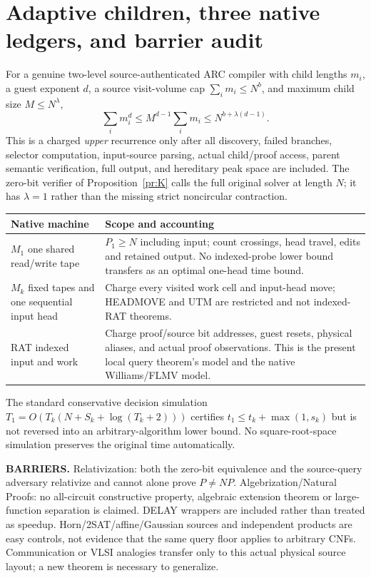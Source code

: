 \documentclass[11pt]{article}
\begin{document}
\section{Adaptive children, three native ledgers, and barrier audit}
For a genuine two-level source-authenticated ARC compiler with child lengths $m_i$, a guest exponent $d$, a source visit-volume cap $\sum_i m_i\le N^b$, and maximum child size $M\le N^\lambda$,
\[
 \sum_i m_i^d\le M^{d-1}\sum_i m_i\le N^{b+\lambda(d-1)}.\tag{5}
\]
This is a charged \emph{upper} recurrence only after all discovery, failed branches, selector computation, input-source parsing, actual child/proof access, parent semantic verification, full output, and hereditary peak space are included. The zero-bit verifier of Proposition~\ref{pr:K} calls the full original solver at length $N$; it has $\lambda=1$ rather than the missing strict noncircular contraction.

\begin{center}\small\begin{tabularx}{.95\linewidth}{p{.21\linewidth}X}\toprule
Native machine & Scope and accounting\\\midrule
$M_1$ one shared read/write tape & $P_1\ge N$ including input; count crossings, head travel, edits and retained output. No indexed-probe lower bound transfers as an optimal one-head time bound.\\
$M_k$ fixed tapes and one sequential input head & Charge every visited work cell and input-head move; HEADMOVE and UTM are restricted and not indexed-RAT theorems.\\
RAT indexed input and work & Charge proof/source bit addresses, guest resets, physical aliases, and actual proof observations. This is the present local query theorem's model and the native Williams/FLMV model.\\\bottomrule
\end{tabularx}\end{center}
The standard conservative decision simulation $T_1=O(T_k(N+S_k+\log(T_k+2)))$ certifies $t_1\le t_k+\max(1,s_k)$ but is not reversed into an arbitrary-algorithm lower bound. No square-root-space simulation preserves the original time automatically.

\noindent\textbf{BARRIERS.} Relativization: both the zero-bit equivalence and the source-query adversary relativize and cannot alone prove $P\ne NP$. Algebrization/Natural Proofs: no all-circuit constructive property, algebraic extension theorem or large-function separation is claimed. DELAY wrappers are included rather than treated as speedup. Horn/2SAT/affine/Gaussian sources and independent products are easy controls, not evidence that the same query floor applies to arbitrary CNFs. Communication or VLSI analogies transfer only to this actual physical source layout; a new theorem is necessary to generalize.
\end{document}
